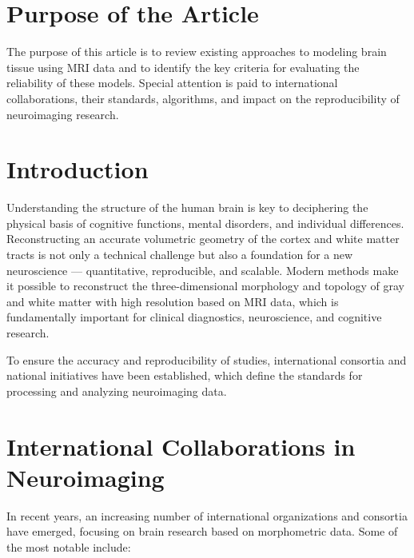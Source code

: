 \documentclass[default]{subfiles}
\begin{document}

\maketitle

\section{Purpose of the Article}

The purpose of this article is to review existing approaches to modeling brain tissue using MRI data and to identify
the key criteria for evaluating the reliability of these models. Special attention is paid to international
collaborations, their standards, algorithms, and impact on the reproducibility of neuroimaging research.

\section{Introduction}

\label{sec:intro}

Understanding the structure of the human brain is key to deciphering the physical basis of cognitive functions, mental
disorders, and individual differences. Reconstructing an accurate volumetric geometry of the cortex and white matter
tracts is not only a technical challenge but also a foundation for a new neuroscience — quantitative, reproducible, and
scalable. Modern methods make it possible to reconstruct the three-dimensional morphology and topology of gray and
white matter with high resolution based on MRI data, which is fundamentally important for clinical diagnostics,
neuroscience, and cognitive research.

To ensure the accuracy and reproducibility of studies, international consortia and national initiatives have been
established, which define the standards for processing and analyzing neuroimaging data. 

\section{International Collaborations in Neuroimaging}

In recent years, an increasing number of international organizations and consortia have emerged, focusing on brain
research based on morphometric data. Some of the most notable include:
\end{document}
